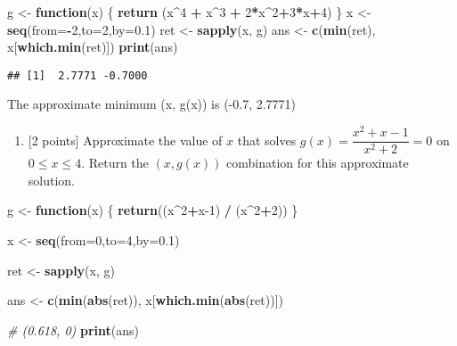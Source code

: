 \documentclass[
]{article}
\newenvironment{Shaded}{\begin{snugshade}}{\end{snugshade}}
\newcommand{\AttributeTok}[1]{\textcolor[rgb]{0.13,0.29,0.53}{#1}}
\newcommand{\CommentTok}[1]{\textcolor[rgb]{0.56,0.35,0.01}{\textit{#1}}}
\newcommand{\ControlFlowTok}[1]{\textcolor[rgb]{0.13,0.29,0.53}{\textbf{#1}}}
\newcommand{\DecValTok}[1]{\textcolor[rgb]{0.00,0.00,0.81}{#1}}
\newcommand{\FloatTok}[1]{\textcolor[rgb]{0.00,0.00,0.81}{#1}}
\newcommand{\FunctionTok}[1]{\textcolor[rgb]{0.13,0.29,0.53}{\textbf{#1}}}
\newcommand{\NormalTok}[1]{#1}
\newcommand{\OtherTok}[1]{\textcolor[rgb]{0.56,0.35,0.01}{#1}}
\newcommand{\SpecialCharTok}[1]{\textcolor[rgb]{0.81,0.36,0.00}{\textbf{#1}}}
\providecommand{\tightlist}{%
  \setlength{\itemsep}{0pt}\setlength{\parskip}{0pt}}
\begin{document}
\begin{Shaded}
\begin{Highlighting}[]
\NormalTok{g }\OtherTok{\textless{}{-}} \ControlFlowTok{function}\NormalTok{(x) \{}
  \FunctionTok{return}\NormalTok{ (x}\SpecialCharTok{\^{}}\DecValTok{4} \SpecialCharTok{+}\NormalTok{ x}\SpecialCharTok{\^{}}\DecValTok{3} \SpecialCharTok{+} \DecValTok{2}\SpecialCharTok{*}\NormalTok{x}\SpecialCharTok{\^{}}\DecValTok{2}\SpecialCharTok{+}\DecValTok{3}\SpecialCharTok{*}\NormalTok{x}\SpecialCharTok{+}\DecValTok{4}\NormalTok{)}
\NormalTok{\}}
\NormalTok{x }\OtherTok{\textless{}{-}} \FunctionTok{seq}\NormalTok{(}\AttributeTok{from=}\SpecialCharTok{{-}}\DecValTok{2}\NormalTok{,}\AttributeTok{to=}\DecValTok{2}\NormalTok{,}\AttributeTok{by=}\FloatTok{0.1}\NormalTok{)}
\NormalTok{ret }\OtherTok{\textless{}{-}} \FunctionTok{sapply}\NormalTok{(x, g)}
\NormalTok{ans }\OtherTok{\textless{}{-}} \FunctionTok{c}\NormalTok{(}\FunctionTok{min}\NormalTok{(ret), x[}\FunctionTok{which.min}\NormalTok{(ret)])}
\FunctionTok{print}\NormalTok{(ans)}
\end{Highlighting}
\end{Shaded}

\begin{verbatim}
## [1]  2.7771 -0.7000
\end{verbatim}

The approximate minimum (x, g(x)) is (-0.7, 2.7771)

\begin{enumerate}
\def\labelenumi{(\alph{enumi})}
\setcounter{enumi}{3}
\tightlist
\item
  {[}2 points{]} Approximate the value of \(x\) that solves
  \(g(x) = \dfrac{x^2 + x - 1}{x^2 + 2} = 0\) on \(0 \le x \le 4\).
  Return the \((x, g(x))\) combination for this approximate solution.
\end{enumerate}

\begin{Shaded}
\begin{Highlighting}[]
\NormalTok{g }\OtherTok{\textless{}{-}} \ControlFlowTok{function}\NormalTok{(x) \{}
  \FunctionTok{return}\NormalTok{((x}\SpecialCharTok{\^{}}\DecValTok{2}\SpecialCharTok{+}\NormalTok{x}\DecValTok{{-}1}\NormalTok{) }\SpecialCharTok{/}\NormalTok{ (x}\SpecialCharTok{\^{}}\DecValTok{2}\SpecialCharTok{+}\DecValTok{2}\NormalTok{))}
\NormalTok{\}}

\NormalTok{x }\OtherTok{\textless{}{-}} \FunctionTok{seq}\NormalTok{(}\AttributeTok{from=}\DecValTok{0}\NormalTok{,}\AttributeTok{to=}\DecValTok{4}\NormalTok{,}\AttributeTok{by=}\FloatTok{0.1}\NormalTok{)}

\NormalTok{ret }\OtherTok{\textless{}{-}} \FunctionTok{sapply}\NormalTok{(x, g)}

\NormalTok{ans }\OtherTok{\textless{}{-}} \FunctionTok{c}\NormalTok{(}\FunctionTok{min}\NormalTok{(}\FunctionTok{abs}\NormalTok{(ret)), x[}\FunctionTok{which.min}\NormalTok{(}\FunctionTok{abs}\NormalTok{(ret))])}

\CommentTok{\# (0.618, 0)}
\FunctionTok{print}\NormalTok{(ans)}
\end{Highlighting}
\end{Shaded}
\end{document}
